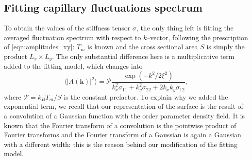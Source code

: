 \subsection{Fitting capillary fluctuations spectrum}
To obtain the values of the stiffness tensor $\sigma$, the only thing left is fitting the averaged fluctuation spectrum with respect to $k$--vector, following the prescription of \cref{eqn:amplitudes_xy}: $T_m$ is known and the cross sectional area $S$ is simply the product $L_x\times L_y$. The only substantial difference here is a multiplicative term added to the fitting model, which changes into
\begin{equation}
\label{eqn:fit-model}
    \langle \lvert A(\bm{k}) \rvert^2 \rangle =\mathcal{P} \frac{\exp{(-k^2/2\xi^2)}}%
    {k_x^2\sigma_{11} + k_y^2\sigma_{22} +2k_x k_y\sigma_{12}},
\end{equation}
where $\mathcal{P}=k_BT_m/S$ is the constant prefactor. %
To explain why we added the exponential term, we recall that our representation of the surface is the result of a convolution of a Gaussian function with the order parameter density field. It is known that the Fourier transform of a convolution is the pointwise product of Fourier transforms and the Fourier transform of a Gaussian is again a Gaussian with a different width: this is the reason behind our modification of the fitting model.

